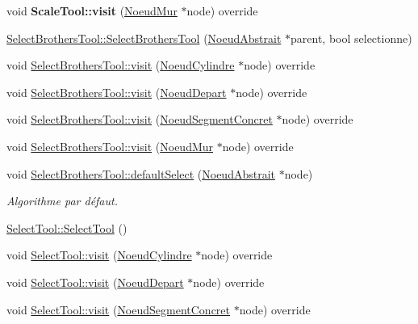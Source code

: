 \begin{DoxyCompactItemize}
\item 
\hypertarget{group__inf2990_ga376afcceadc7462902ff0e3bad3573e9}{}void {\bfseries Scale\+Tool\+::visit} (\hyperlink{class_noeud_mur}{Noeud\+Mur} $\ast$node) override\label{group__inf2990_ga376afcceadc7462902ff0e3bad3573e9}

\item 
\hyperlink{group__inf2990_gaa7c8bdba711edc6d4817c02c19f3dbe0}{Select\+Brothers\+Tool\+::\+Select\+Brothers\+Tool} (\hyperlink{class_noeud_abstrait}{Noeud\+Abstrait} $\ast$parent, bool selectionne)
\item 
void \hyperlink{group__inf2990_ga107677b2987385a2604f9c3ec11670b6}{Select\+Brothers\+Tool\+::visit} (\hyperlink{class_noeud_cylindre}{Noeud\+Cylindre} $\ast$node) override
\item 
void \hyperlink{group__inf2990_gac19bea128f3c4fb5084a44c761482ec9}{Select\+Brothers\+Tool\+::visit} (\hyperlink{class_noeud_depart}{Noeud\+Depart} $\ast$node) override
\item 
void \hyperlink{group__inf2990_gaf85983eda4fdee6755880c48d5acef1e}{Select\+Brothers\+Tool\+::visit} (\hyperlink{class_noeud_segment_concret}{Noeud\+Segment\+Concret} $\ast$node) override
\item 
void \hyperlink{group__inf2990_gaa9bd4b29b9f7865ac1903de6b6e5a0ca}{Select\+Brothers\+Tool\+::visit} (\hyperlink{class_noeud_mur}{Noeud\+Mur} $\ast$node) override
\item 
void \hyperlink{group__inf2990_ga53a73bc192206845143b838a267a7a3e}{Select\+Brothers\+Tool\+::default\+Select} (\hyperlink{class_noeud_abstrait}{Noeud\+Abstrait} $\ast$node)
\begin{DoxyCompactList}\small\item\em Algorithme par défaut. \end{DoxyCompactList}\item 
\hyperlink{group__inf2990_ga2174af55e744036f0ccc5ce1fe25ddb1}{Select\+Tool\+::\+Select\+Tool} ()
\item 
void \hyperlink{group__inf2990_gacd9fee116b738725ab0f664029253fa0}{Select\+Tool\+::visit} (\hyperlink{class_noeud_cylindre}{Noeud\+Cylindre} $\ast$node) override
\item 
void \hyperlink{group__inf2990_ga392f7eb2a74106cff675878f5453a9d3}{Select\+Tool\+::visit} (\hyperlink{class_noeud_depart}{Noeud\+Depart} $\ast$node) override
\item 
void \hyperlink{group__inf2990_ga3e4db43bef245d0d88d49f018fee424f}{Select\+Tool\+::visit} (\hyperlink{class_noeud_segment_concret}{Noeud\+Segment\+Concret} $\ast$node) override

\end{DoxyCompactItemize}
